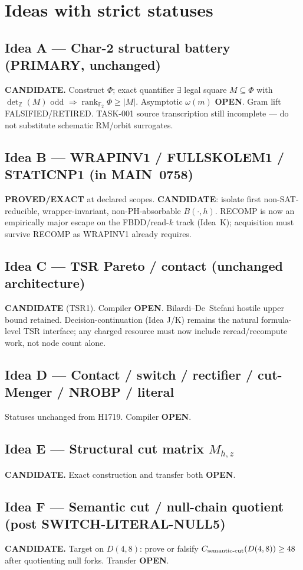 \documentclass[11pt]{article}
\begin{document}
\section*{Ideas with strict statuses}
\subsection*{Idea A --- Char-2 structural battery (PRIMARY, unchanged)}
\textbf{CANDIDATE.} Construct $\Phi$; exact quantifier
$\exists$ legal square $M\subseteq\Phi$ with $\det_{\mathbb Z}(M)$ odd
$\Rightarrow\operatorname{rank}_{\mathbb F_2}\Phi\ge|M|$. Asymptotic $\omega(m)$ \textbf{OPEN}.
Gram lift FALSIFIED/RETIRED. TASK-001 source transcription still incomplete --- do not
substitute schematic RM/orbit surrogates.

\subsection*{Idea B --- WRAPINV1 / FULLSKOLEM1 / STATICNP1 (in MAIN~0758)}
\textbf{PROVED/EXACT} at declared scopes.
\textbf{CANDIDATE}: isolate first non-SAT-reducible, wrapper-invariant, non-PH-absorbable $B(\cdot,h)$.
RECOMP is now an empirically major escape on the FBDD/read-$k$ track (Idea~K); acquisition
must survive RECOMP as WRAPINV1 already requires.

\subsection*{Idea C --- TSR Pareto / contact (unchanged architecture)}
\textbf{CANDIDATE} (TSR1). Compiler \textbf{OPEN}. Bilardi--De~Stefani hostile upper bound retained.
Decision-continuation (Idea J/K) remains the natural formula-level TSR interface;
any charged resource must now include reread/recompute work, not node count alone.

\subsection*{Idea D --- Contact / switch / rectifier / cut-Menger / NROBP / literal}
Statuses unchanged from H1719. Compiler \textbf{OPEN}.

\subsection*{Idea E --- Structural cut matrix $M_{h,z}$}
\textbf{CANDIDATE.} Exact construction and transfer both \textbf{OPEN}.

\subsection*{Idea F --- Semantic cut / null-chain quotient (post SWITCH-LITERAL-NULL5)}
\textbf{CANDIDATE.} Target on $D(4,8)$: prove or falsify
$C_{\rm semantic\textrm{-}cut}(D(4,8))\ge 48$ after quotienting null forks. Transfer \textbf{OPEN}.
\end{document}
